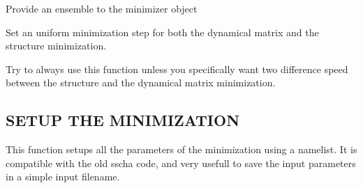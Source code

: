 \documentclass[a4paper,11pt,english]{sphinxmanual}
\begin{document}
\begin{fulllineitems}
\begin{fulllineitems}
\begin{quote}
\begin{description}
\end{description}
\end{quote}

\end{fulllineitems}


\begin{fulllineitems}
\label{\detokenize{apireference:sscha.SchaMinimizer.SSCHA_Minimizer.set_ensemble}}
\pysigstartsignatures
{}
\pysigstopsignatures
\sphinxAtStartPar
Provide an ensemble to the minimizer object

\end{fulllineitems}


\begin{fulllineitems}
\label{\detokenize{apireference:sscha.SchaMinimizer.SSCHA_Minimizer.set_minimization_step}}
\pysigstartsignatures
{}
\pysigstopsignatures
\sphinxAtStartPar
Set an uniform minimization step for both the dynamical matrix and the structure minimization.

\sphinxAtStartPar
Try to always use this function unless you specifically want two difference speed between the structure and the dynamical matrix minimization.

\end{fulllineitems}


\begin{fulllineitems}
\label{\detokenize{apireference:sscha.SchaMinimizer.SSCHA_Minimizer.setup_from_namelist}}
\pysigstartsignatures
{}
\pysigstopsignatures

\subsection{SETUP THE MINIMIZATION}
\label{\detokenize{apireference:setup-the-minimization}}
\sphinxAtStartPar
This function setups all the parameters of the minimization using a namelist.
It is compatible with the old sscha code, and very usefull to save the
input parameters in a simple input filename.



\end{fulllineitems}
\end{fulllineitems}
\end{document}
